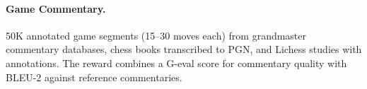 \paragraph{Game Commentary.} 50K annotated game segments (15--30 moves each) from grandmaster commentary databases, chess books transcribed to PGN, and Lichess studies with annotations. The reward combines a G-eval score for commentary quality with BLEU-2 against reference commentaries.

